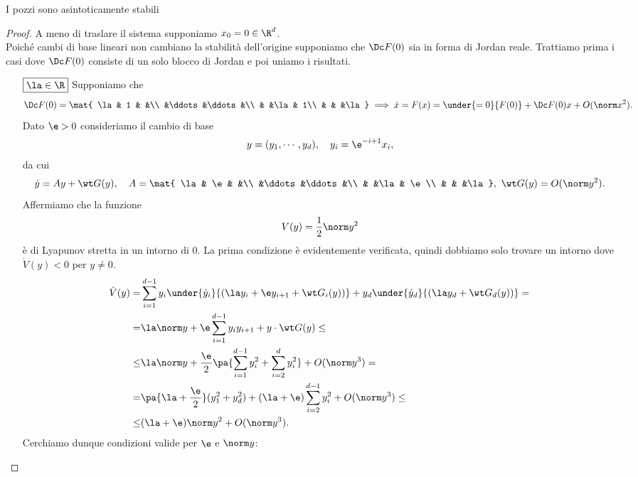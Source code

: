 \begin{proposition}\label{StabilitaPozzi}
    I pozzi sono asintoticamente stabili
\end{proposition}
\begin{proof}
    A meno di traslare il sistema supponiamo $x_0=0\in\R^d$.\\
    Poich\'e cambi di base lineari non cambiano la stabilit\`a dell'origine supponiamo che $\Dc F(0)$ sia in forma di Jordan reale. Trattiamo prima i casi dove $\Dc F(0)$ consiste di un solo blocco di Jordan e poi uniamo i risultati.
    \setlength{\leftmargini}{0cm}
    \begin{itemize}
        \item[$\boxed{\la\in\R}$] 
        Supponiamo che
        \[\Dc F(0)=\mat{
        \la & 1    &      &\\
            &\ddots&\ddots&\\
            &       &\la & 1\\
            &       &    &\la 
        }\implies \dot x=F(x)=\under{=0}{F(0)}+\Dc F(0)x+O(\norm x^2).\]
        Dato $\e>0$ consideriamo il cambio di base
        \[y=(y_1,\cdots, y_d),\quad y_i=\e^{-i+1}x_{i},\]
        da cui
        \[\dot y=A y+\wt G(y),\quad A=\mat{
        \la & \e    &      &\\
            &\ddots&\ddots&\\
            &       &\la & \e\\
            &       &    &\la 
        },\ {\wt G(y)}=O(\norm y^2).\]
        Affermiamo che la funzione
        \[V(y)=\frac12 \norm y^2\]
        \`e di Lyapunov stretta in un intorno di $0$. La prima condizione \`e evidentemente verificata, quindi dobbiamo solo trovare un intorno dove $\dot V(y)<0$ per $y\neq 0$.
        \begin{align*}
            \dot V(y)=&\sum_{i=1}^{d-1}y_i\under{\dot y_i}{(\la y_i+\e y_{i+1}+\wt G_i(y))}+y_d\under{\dot y_d}{(\la y_d+\wt G_d(y))}=\\
            =&\la\norm y+\e \sum_{i=1}^{d-1}y_iy_{i+1}+{y\cdot \wt G(y)}\leq\\
            \leq& \la\norm y+\frac\e2 \pa{\sum_{i=1}^{d-1}y_i^2 +\sum_{i=2}^{d}y_i^2}+O(\norm y^3)=\\
            =&\pa{\la+\frac\e2}(y_1^2+y_d^2)+(\la+\e)\sum_{i=2}^{d-1}y_i^2+O(\norm y^3)\leq\\
            \leq& (\la+\e)\norm y^2+O(\norm y^3).
        \end{align*}
        Cerchiamo dunque condizioni valide per $\e$ e $\norm y$:\\

\end{itemize}
\end{proof}

